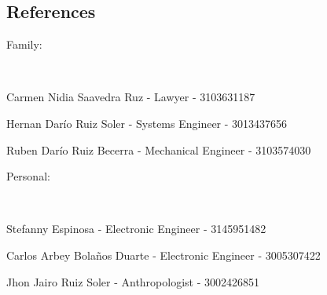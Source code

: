 \documentclass[10pt,a4paper]{article}
\newenvironment{indentsection}[1]%
{\begin{list}{}%
	{\setlength{\leftmargin}{#1}}%
	\item[]%
}
{\end{list}}
\begin{document}
\subsection*{References}
\begin{indentsection}{\parindent}
\begin{description*}
	\item[Family:]
	
	\begin{itemize*}
		\
		\item
		\item Carmen Nidia Saavedra Ruz - Lawyer - 3103631187
		\item Hernan Darío Ruiz Soler - Systems Engineer - 3013437656
		\item Ruben Darío Ruiz Becerra - Mechanical Engineer - 3103574030
	\end{itemize*}

	\item[Personal:]
	
	\begin{itemize*}
		\
		\item
		\item Stefanny Espinosa - Electronic Engineer -  3145951482
		\item Carlos Arbey Bolaños Duarte - Electronic Engineer -  3005307422
		\item Jhon Jairo Ruiz Soler - Anthropologist - 3002426851
	\end{itemize*}
\end{description*}
\end{indentsection}
\end{document}
